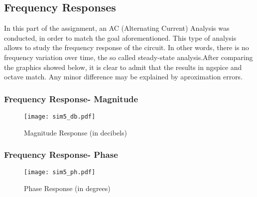 \clearpage
\subsection{Frequency Responses}

In this part of the assignment, an AC (Alternating Current) Analysis was conducted, in order to match the goal aforementioned. This type of analysis allows to study the frequency response of the circuit. In other words, there is no frequency variation over time, the so called steady-state analysis.After comparing the graphics showed below, it is clear to admit that the results in ngspice and octave match. Any minor difference may be explained by aproximation errors.

\subsubsection{Frequency Response- Magnitude}
\begin{figure}[h] \centering
\texttt{[image: sim5\_db.pdf]}
\caption{Magnitude Response (in decibels)}
\label{fig:sim5_db}
\end{figure}
\subsubsection{Frequency Response- Phase}
\begin{figure}[h] \centering
\texttt{[image: sim5\_ph.pdf]}
\caption{Phase Response (in degrees)}
\label{fig:sim5_ph}
\end{figure}
\newpage






